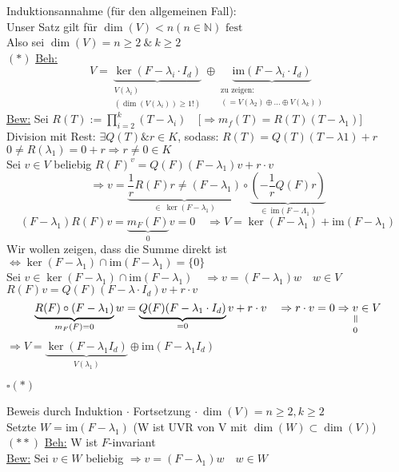 \documentclass[titlepage,12pt,a4paper,ngerman]{report}
\newcommand{\verteq}{\rotatebox{90}{$\,=$}}
\newcommand{\equalto}[2]{\underset{\scriptstyle\overset{\mkern4mu\verteq}{#2}}{#1}}
\newcommand{\tx}[1]{\textrm{#1}}
\newcommand{\ub}[1]{\underbrace{#1}}
\newcommand{\im}{\tx{im}}
\begin{document}
Induktionsannahme (für den allgemeinen Fall): \\
Unser Satz gilt für $ \dim(V) < n (n\in \mathbb{N}) \tx{ fest} $\\
Also sei $ \dim(V) = n \ge 2 \ \&\  k \ge 2 $ \\
$(*)$ \underline{Beh:} \\	
$$ V = \ub{\ker(F-\lambda_i \cdot I_d)}_{\substack{V(\lambda_i)  \\ (\dim(V(\lambda_i)) \ge 1 !)}} \oplus \ub{\im(F-\lambda_i \cdot I_d)}_{\substack{\tx{zu zeigen:} \\ (= V(\lambda_2) \oplus \dots \oplus V(\lambda_k))}} $$
\underline{Bew:} Sei $ R(T) := \prod_{i=2}^{k}(T-\lambda_i) \quad \bigg[ \Rightarrow m_f(T) = R(T) (T-\lambda_1)\bigg] $\\
Division mit Rest: $ \exists Q(T) \& r\in K $, sodass:
$R(T) = Q(T) (T-\lambda1) + r $\\
$0 \neq R(\lambda_1) = 0 + r \Rightarrow r \neq 0 \in K$\\
Sei $ v\in V $ beliebig $ R(F)^v = Q(F) (F-\lambda_1) v + r \cdot v $\\
$$\Rightarrow v = \ub{\frac{1}{r} R(F) r \neq (F-\lambda_1) }_{\in \ \ker(F-\lambda_1)} \circ \ub{(-\frac{1}{r} Q(F) r)}_{\in \ \im(F-\Lambda_1)} $$
$$(F-\lambda_1) R(F)v = \ub{m_F(F)}_{0}v = 0 \quad \Rightarrow V = \ker(F-\lambda_1) + \im(F-\lambda_1)$$
Wir wollen zeigen, dass die Summe direkt ist $ \Leftrightarrow  \ker(F-\lambda_1) \cap \im(F-\lambda_1) = \{0\}$\\
Sei $ v \in \ker(F-\lambda_1) \cap \im(F-\lambda_1) \quad \Rightarrow v = (F-\lambda_1)w \quad w\in V $\\
$R(F)v = Q(F) (F-\lambda\cdot I_d) v + r\cdot v $\\
$$\ub{R(F)\circ (F-\lambda_1)}_{m_F(F) = 0} w = \ub{Q(F)(F-\lambda_1 \cdot I_d)}_{= 0} v + r \cdot v \quad \Rightarrow r \cdot v = 0 \Rightarrow \equalto{v}{0} \in V$$
$\Rightarrow V = \ub{\ker(F-\lambda_1 I_d)}_{V(\lambda_1)} \oplus \im(F-\lambda_1 I_d ) $
\begin{flushright}
	$ \square (*)$
\end{flushright}
Beweis durch Induktion $ \cdot $ Fortsetzung $ \cdot \ \dim(V) = n \ge 2 , k \ge 2$\\
Setzte $ W = \im(F-\lambda_1) $ (W ist UVR von V mit $ \dim(W) \subset \dim(V) $)\\
$(**)$ \underline{Beh:} W ist $ F $-invariant\\
\underline{Bew:} Sei $ v\in W $ beliebig $ \Rightarrow v = (F-\lambda_1) w \quad w \in W$\\
\end{document}

